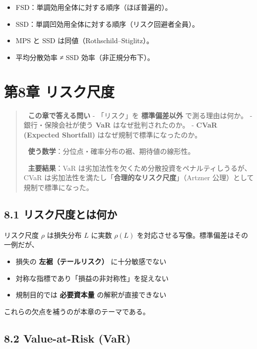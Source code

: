 \documentclass[11pt,a4paper]{report}
\begin{document}
\begin{itemize}
\item FSD：単調効用全体に対する順序（ほぼ普遍的）。
\item SSD：単調凹効用全体に対する順序（リスク回避者全員）。
\item MPS と SSD は同値（Rothschild–Stiglitz）。
\item 平均分散効率 ≠ SSD 効率（非正規分布下）。
\end{itemize}

\noindent\hrulefill

\chapter{第8章 リスク尺度}

\begin{quote}
🎯 \textbf{この章で答える問い}
- 「リスク」を \textbf{標準偏差以外} で測る理由は何か。
- 銀行・保険会社が使う \textbf{VaR} はなぜ批判されたのか。
- \textbf{CVaR (Expected Shortfall)} はなぜ規制で標準になったのか。

📐 \textbf{使う数学}：分位点・確率分布の裾、期待値の線形性。

🔑 \textbf{主要結果}：VaR は劣加法性を欠くため分散投資をペナルティしうるが、CVaR は劣加法性を満たし「\textbf{合理的なリスク尺度}」（Artzner 公理）として規制で標準になった。
\end{quote}

\section{8.1 リスク尺度とは何か}

リスク尺度 $\rho$ は損失分布 $L$ に実数 $\rho(L)$ を対応させる写像。標準偏差はその一例だが、

\begin{itemize}
\item 損失の \textbf{左裾（テールリスク）} に十分敏感でない
\item 対称な指標であり「損益の非対称性」を捉えない
\item 規制目的では \textbf{必要資本量} の解釈が直接できない
\end{itemize}

これらの欠点を補うのが本章のテーマである。

\section{8.2 Value-at-Risk (VaR)}
\end{document}
